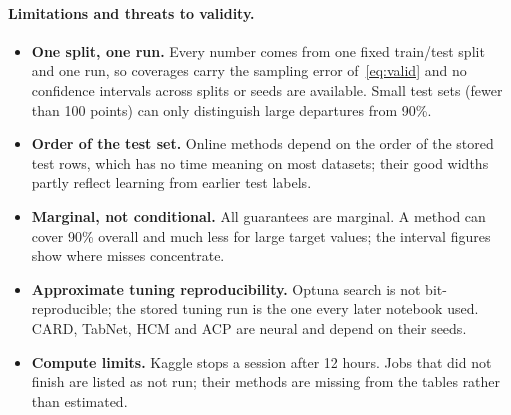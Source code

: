 \documentclass[11pt]{article}
\begin{document}
\paragraph{Limitations and threats to validity.}
\begin{itemize}
\item \textbf{One split, one run.} Every number comes from one fixed train/test split and one run, so coverages carry the sampling
error of~\eqref{eq:valid} and no confidence intervals across splits or seeds are available. Small test sets (fewer than 100 points)
can only distinguish large departures from 90\%.
\item \textbf{Order of the test set.} Online methods depend on the order of the stored test rows, which has no time meaning on most
datasets; their good widths partly reflect learning from earlier test labels.
\item \textbf{Marginal, not conditional.} All guarantees are marginal. A method can cover 90\% overall and much less for large target
values; the interval figures show where misses concentrate.
\item \textbf{Approximate tuning reproducibility.} Optuna search is not bit-reproducible; the stored tuning run is the one every
later notebook used. CARD, TabNet, HCM and ACP are neural and depend on their seeds.
\item \textbf{Compute limits.} Kaggle stops a session after 12 hours. Jobs that did not finish are listed as not run; their methods are
missing from the tables rather than estimated.
\end{itemize}
\end{document}
